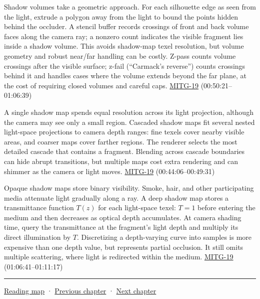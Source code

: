 Shadow volumes take a geometric approach. For each silhouette edge as seen from the light, extrude a polygon away from the light to bound the points hidden behind the occluder. A stencil buffer records crossings of front and back volume faces along the camera ray; a nonzero count indicates the visible fragment lies inside a shadow volume. This avoids shadow-map texel resolution, but volume geometry and robust near/far handling can be costly. Z-pass counts volume crossings after the visible surface; z-fail (``Carmack's reverse'') counts crossings behind it and handles cases where the volume extends beyond the far plane, at the cost of requiring closed volumes and careful caps. \hyperref[04-visual-computing-ii-ch036]{MITG-19} (00:50:21--01:06:39)

A single shadow map spends equal resolution across its light projection, although the camera may see only a small region. Cascaded shadow maps fit several nested light-space projections to camera depth ranges: fine texels cover nearby visible areas, and coarser maps cover farther regions. The renderer selects the most detailed cascade that contains a fragment. Blending across cascade boundaries can hide abrupt transitions, but multiple maps cost extra rendering and can shimmer as the camera or light moves. \hyperref[04-visual-computing-ii-ch036]{MITG-19} (00:44:06--00:49:31)

Opaque shadow maps store binary visibility. Smoke, hair, and other participating media attenuate light gradually along a ray. A deep shadow map stores a transmittance function \(T(z)\) for each light-space texel: \(T=1\) before entering the medium and then decreases as optical depth accumulates. At camera shading time, query the transmittance at the fragment's light depth and multiply its direct illumination by \(T\). Discretizing a depth-varying curve into samples is more expensive than one depth value, but represents partial occlusion. It still omits multiple scattering, where light is redirected within the medium. \hyperref[04-visual-computing-ii-ch036]{MITG-19} (01:06:41--01:11:17)

\begin{center}\rule{0.5\linewidth}{0.5pt}\end{center}

\href{Chapter\%20Edition/02\%20-\%20Graphics\%20Vision\%20and\%20XR/00\%20-\%20Reading\%20Map}{Reading map} · \hyperref[04-visual-computing-ii-ch027]{Previous chapter} · \hyperref[04-visual-computing-ii-ch029]{Next chapter}
